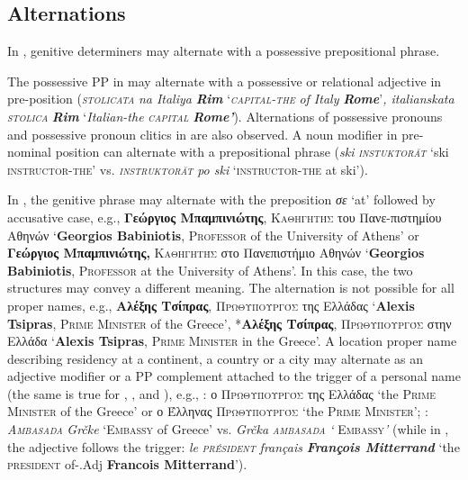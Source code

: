 \documentclass[output=paper]{langsci/langscibook}
\newcommand{\trigger}[1]{\textsc{#1}}
\begin{document}
\subsection{Alternations} %

In , genitive determiners may alternate with a possessive
prepositional phrase.

The possessive PP in  may alternate with a possessive or
relational adjective in pre-position (\textit{\trigger{stolicata}}
\textit{na Italiya} \textbf{\textit{Rim}} ‘\textit{\trigger{capital-the}}
\textit{of Italy }\textbf{\textit{Rome}}’\textit{, italianskata}\trigger{
}\textit{\trigger{stolica}} \textbf{\textit{Rim}} ‘\textit{Italian-the
}\textit{\trigger{capital}} \textbf{\textit{Rome’}}). Alternations of
possessive pronouns and possessive pronoun clitics in  are
also observed. A noun modifier in pre-nominal position can alternate
with a prepositional phrase (\textit{ski }\textit{\trigger{instuktorăt}}
`ski \trigger{instructor-the}' vs. \textit{\trigger{instruktorăt}}
\textit{po ski }`\trigger{instructor-the} at ski').



In , the genitive phrase may alternate with the preposition
\textit{σε} ‘at’ followed by accusative case, e.g.,
\textbf{Γεώργιος Μπαμπινιώτης},
\trigger{Καθηγητής} του Πανε-πιστημίου Αθηνών
‘\textbf{Georgios Babiniotis}, \trigger{Professor} of the University of
Athens’ or \textbf{Γεώργιος Μπαμπινιώτης,}
\trigger{Καθηγητής} στο Πανεπιστήμιο Αθηνών ‘\textbf{Georgios Babiniotis}, \trigger{Professor} at the University of
Athens’. In this case, the two structures may convey a different
meaning. The alternation is not possible for all proper names, e.g.,
\textbf{Αλέξης Τσίπρας},
\trigger{Πρωθυπουργός} της Ελλάδας ‘\textbf{Alexis
Tsipras}, \trigger{Prime} \trigger{Minister} of the Greece’,
*\textbf{Αλέξης Τσίπρας},
\trigger{Πρωθυπουργός} στην Ελλάδα ‘\textbf{Alexis
Tsipras}, \trigger{Prime Minister} in the Greece’. A location proper name
describing residency at a continent, a country or a city may alternate
as an adjective modifier or a PP complement attached to the trigger of
a personal name (the same is true for , , and ),
e.g., : ο \trigger{Πρωθυπουργός} της Ελλάδας
‘the \trigger{Prime Minister} of the Greece’ or ο Έλληνας
\trigger{Πρωθυπουργός} ‘the  \trigger{Prime Minister}’; :
\textit{\trigger{Ambasada}} \textit{Grčke} ‘\trigger{Embassy} of Greece’
vs. \textit{Grčka }\textit{\trigger{ambasada}}\textit{ ‘}
\trigger{Embassy}\textit{’} (while in , the adjective follows the
trigger:\textit{ le }\textit{\trigger{président}}\textit{ français
}\textbf{\textit{François Mitterrand}} ‘the \trigger{president}
of-.Adj \textbf{Francois Mitterrand}’).
\end{document}
